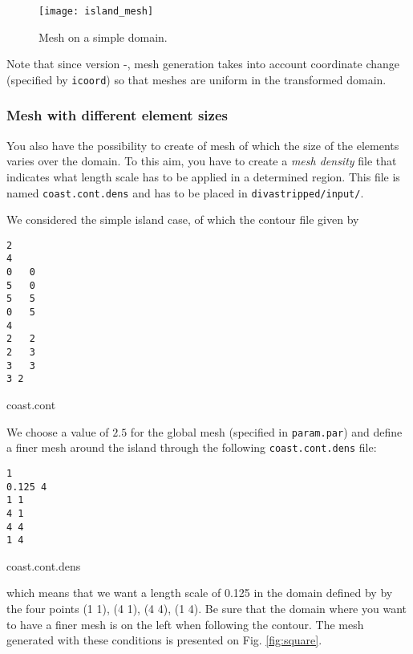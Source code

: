 \begin{figure}[htpb]
\centering
\parbox{.7\textwidth}{
\texttt{[image: island\_mesh]}
}\parbox{.3\textwidth}{
\caption{Mesh on a simple domain.}
}
\end{figure}

Note that since version \diva-\divaversion, mesh generation takes into account coordinate change (specified by \texttt{icoord}) so that meshes are
uniform in the transformed domain. 




\subsubsection{Mesh with different element sizes}

You also have the possibility to create of mesh of which the size of the elements varies over the domain. To this aim, you have to create a \textit{mesh density} file that indicates what length scale has to be applied in a determined region. This file is named \texttt{coast.cont.dens} and has to be placed in \texttt{divastripped/input/}.

We considered the simple island case, of which the contour file given by

\begin{exfile}[htpb]
\begin{footnotesize}
\begin{verbatim}
2
4
0	0
5	0
5	5
0	5
4
2	2
2	3
3	3
3 2
\end{verbatim}
\end{footnotesize}
\caption{coast.cont}
\end{exfile}

We choose a value of $2.5$ for the global mesh (specified in \texttt{param.par}) and define a finer mesh around the island through the following \texttt{coast.cont.dens} file:

\begin{exfile}[htpb]
\begin{footnotesize}
\begin{verbatim}
1
0.125 4
1 1
4 1
4 4
1 4
\end{verbatim}
\end{footnotesize}
\caption{coast.cont.dens}
\end{exfile}

which means that we want a length scale of 0.125 in the domain defined by by the four points (1 1), (4 1), (4 4), (1 4). Be sure that the domain where you want to have a finer mesh is on the left when following the contour. The mesh generated with these conditions is presented on Fig. \ref{fig:square}.

